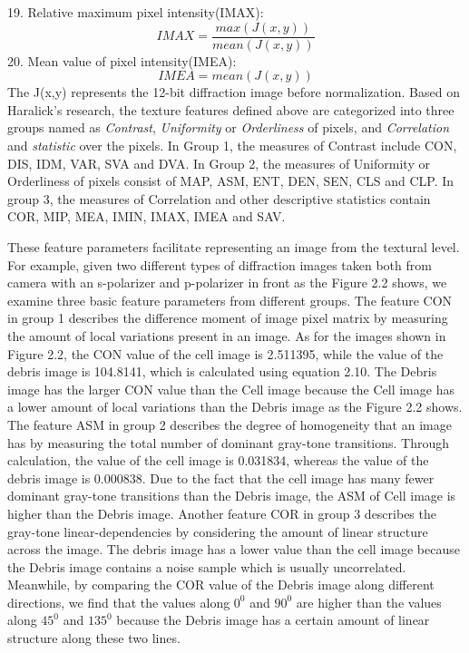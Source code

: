 19. Relative maximum pixel intensity(IMAX):
\begin{equation}
IMAX = \frac{max(J(x,y))}{mean(J(x,y))}
\end{equation}
20. Mean value of pixel intensity(IMEA):
\begin{equation}
IMEA = mean(J(x,y))
\end{equation}
The J(x,y) represents the 12-bit diffraction image before normalization. Based on Haralick's research\cite{Thati}, the texture features defined above are categorized into three groups named as \textit{Contrast}, \textit{Uniformity} or \textit{Orderliness} of pixels, and \textit{Correlation} and \textit{statistic} over the pixels. In Group 1, the measures of Contrast include CON, DIS, IDM, VAR, SVA and DVA. In Group 2, the measures of Uniformity or Orderliness of pixels consist of MAP, ASM, ENT, DEN, SEN, CLS and CLP. In group 3, the measures of Correlation and other descriptive statistics contain COR, MIP, MEA, IMIN, IMAX, IMEA and SAV.\par
These feature parameters facilitate representing an image from the textural level. For example, given two different types of diffraction images taken both from camera with an s-polarizer and p-polarizer in front as the Figure 2.2 shows, we examine three basic feature parameters from different groups. The feature CON in group 1 describes the difference moment of image pixel matrix by measuring the amount of local variations present in an image. As for the images shown in Figure 2.2, the CON value of the cell image is 2.511395, while the value of the debris image is 104.8141, which is calculated using equation 2.10. The Debris image has the larger CON value than the Cell image because the Cell image has a lower amount of local variations than the Debris image as the Figure 2.2 shows. The feature ASM in group 2 describes the degree of homogeneity that an image has by measuring the total number of dominant gray-tone transitions. Through calculation, the value of the cell image is 0.031834, whereas the value of the debris image is 0.000838. Due to the fact that the cell image has many fewer dominant gray-tone transitions than the Debris image, the ASM of Cell image is higher than the Debris image. Another feature COR in group 3 describes the gray-tone linear-dependencies by considering the amount of linear structure across the image. The debris image has a lower value than the cell image because the Debris image contains a noise sample which is usually uncorrelated. Meanwhile, by comparing the COR value of the Debris image along different directions, we find that the values along $0^0$ and $90^0$ are higher than the values along $45^0$ and $135^0$ because the Debris image has a certain amount of linear structure along these two lines. 

